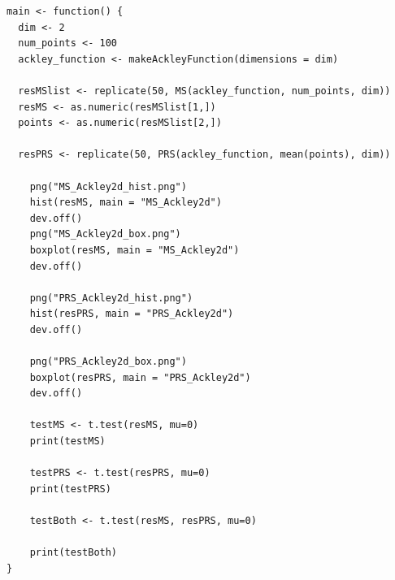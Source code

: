 \documentclass{article}
\begin{document}
\begin{verbatim}
main <- function() {
  dim <- 2
  num_points <- 100
  ackley_function <- makeAckleyFunction(dimensions = dim)
  
  resMSlist <- replicate(50, MS(ackley_function, num_points, dim))
  resMS <- as.numeric(resMSlist[1,])  
  points <- as.numeric(resMSlist[2,])  

  resPRS <- replicate(50, PRS(ackley_function, mean(points), dim))
  
    png("MS_Ackley2d_hist.png")
    hist(resMS, main = "MS_Ackley2d")
    dev.off() 
    png("MS_Ackley2d_box.png")
    boxplot(resMS, main = "MS_Ackley2d")
    dev.off()

    png("PRS_Ackley2d_hist.png")
    hist(resPRS, main = "PRS_Ackley2d")
    dev.off()

    png("PRS_Ackley2d_box.png")
    boxplot(resPRS, main = "PRS_Ackley2d")
    dev.off()

    testMS <- t.test(resMS, mu=0)
    print(testMS)

    testPRS <- t.test(resPRS, mu=0)
    print(testPRS)

    testBoth <- t.test(resMS, resPRS, mu=0)

    print(testBoth)
}   

\end{verbatim}
\end{document}

